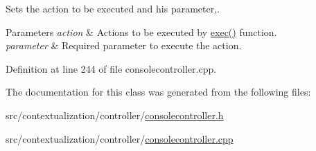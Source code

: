 Sets the action to be executed and his parameter,. 


\begin{DoxyParams}{Parameters}
{\em action} & Actions to be executed by \mbox{\hyperlink{classConsoleController_accdfd546eef82cfe4d0942426a3b6fac}{exec()}} function. \\
\hline
{\em parameter} & Required parameter to execute the action. \\
\hline
\end{DoxyParams}


Definition at line 244 of file consolecontroller.\+cpp.



The documentation for this class was generated from the following files\+:\begin{DoxyCompactItemize}
\item 
src/contextualization/controller/\mbox{\hyperlink{consolecontroller_8h}{consolecontroller.\+h}}\item 
src/contextualization/controller/\mbox{\hyperlink{consolecontroller_8cpp}{consolecontroller.\+cpp}}\end{DoxyCompactItemize}
